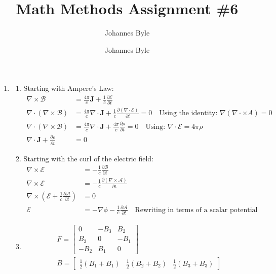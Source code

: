 \documentclass[12pt]{article}
\title{}
\author{Johannes Byle}
\title{Math Methods Assignment \#6}
\author{Johannes Byle}
\newcommand{\p}[2]{\frac{\partial #1}{\partial #2}}
\newcommand{\curl}{\nabla\times}
\newcommand{\divr}{\nabla\cdot}
\begin{document}
    \maketitle
    \begin{enumerate}
        \item
        \begin{enumerate}
            \item Starting with Ampere's Law:
            \begin{align*}
                \curl\mathcal{B}&=\frac{4\pi}{c}\pmb{J}+\frac{1}{c}\p{\mathcal{E}}{t}\\
                \divr\left(\nabla\times\mathcal{B}\right)&=\frac{4\pi}{c}\divr\pmb{J}+\frac{1}{c}\p{(\nabla\cdot\mathcal{E})}{t}=0\quad\text{Using the identity: }\nabla\left( \nabla\cdot\times A \right)=0\\
                \divr\left(\nabla\times\mathcal{B}\right)&=\frac{4\pi}{c}\divr\pmb{J}+\frac{4\pi}{c}\p{\rho}{t}=0\quad\text{Using: }\nabla\cdot\mathcal{E}=4\pi\rho\\
                \divr\pmb{J}+\p{\rho}{t}&=0
            \end{align*}
            \item Starting with the curl of the electric field:
            \begin{align*}
                \curl\mathcal{E}&=-\frac{1}{c}\p{\mathcal{B}}{t}\\
                \curl\mathcal{E}&=-\frac{1}{c}\p{(\curl\mathcal{A})}{t}\\
                \curl\left(\mathcal{E}+\frac{1}{c}\p{\mathcal{A}}{t}\right)&=0\\
                \mathcal{E}&=-\nabla\phi-\frac{1}{c}\p{\mathcal{A}}{t}\quad\text{Rewriting in terms of a scalar potential}
            \end{align*}
            \item
            \begin{gather*}
                F=
                \begin{bmatrix}
                    0    & -B_3 & B_2  \\
                    B_3  & 0    & -B_1 \\
                    -B_2 & B_1  & 0
                \end{bmatrix}\\
                B=
                \begin{bmatrix}
                    \frac{1}{2}(B_1+B_1) & \frac{1}{2}(B_2+B_2)& \frac{1}{2}(B_3+B_3)

\end{bmatrix}
\end{gather*}
\end{enumerate}
\end{enumerate}
\end{document}
